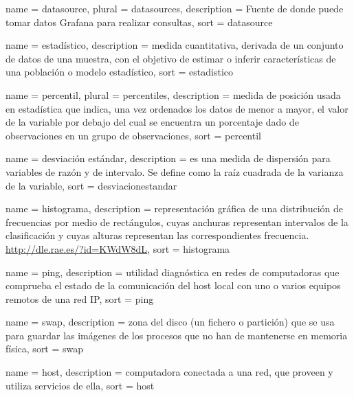 \newpage

 {
  name        = {datasource},
  plural      = {datasources},
  description = {Fuente de donde puede tomar datos Grafana para realizar consultas},
  sort        = {datasource}
}

 {
  name        = {estadístico},
  description =
    {medida cuantitativa, derivada de un conjunto de datos de una muestra, con
    el objetivo de estimar o inferir características de una población o modelo
    estadístico},
  sort        = {estadistico}
}

 {
  name        = {percentil},
  plural      = {percentiles},
  description =
    {medida de posición usada en estadística que indica, una vez ordenados los
    datos de menor a mayor, el valor de la variable por debajo del cual se
    encuentra un porcentaje dado de observaciones en un grupo de observaciones},
  sort        = {percentil}
}

 {
  name        = {desviación estándar},
  description =
    {es una medida de dispersión para variables de razón y de intervalo. Se
    define como la raíz cuadrada de la varianza de la variable},
  sort        = {desviacionestandar}
}

 {
  name        = {histograma},
  description =
    {representación gráfica de una distribución de frecuencias por medio de
    rectángulos, cuyas anchuras representan intervalos de la clasificación y
    cuyas alturas representan las correspondientes frecuencia.
    \url{http://dle.rae.es/?id=KWdW8dL}},
  sort        = {histograma}
}

 {
  name        = {ping},
  description =
    {utilidad diagnóstica en redes de computadoras que comprueba el estado de
    la comunicación del host local con uno o varios equipos remotos de una red
    IP},
  sort        = {ping}
}

 {
  name        = {swap},
  description =
    {zona del disco (un fichero o partición) que se usa para guardar las
    imágenes de los procesos que no han de mantenerse en memoria física},
  sort        = {swap}
}

 {
  name        = {host},
  description =
    {computadora conectada a una red, que proveen y utiliza servicios de ella},
  sort        = {host}
}


